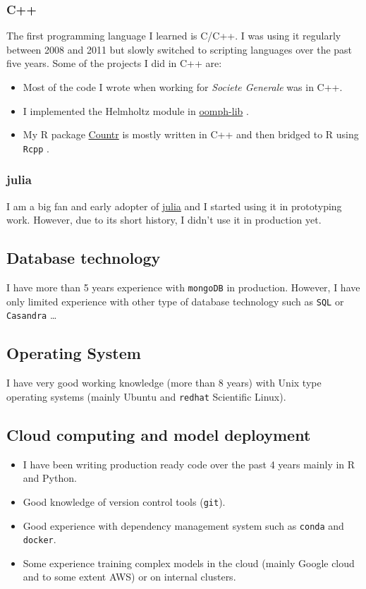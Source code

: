 \documentclass[11pt]{article}
\begin{document}
\subsubsection{C++}
\label{sec:org3cc3ba3}
The first programming language I learned is C/C++. I was using it regularly
between 2008 and 2011 but slowly switched to scripting languages over the
past five years. Some of the projects I did in C++ are:
\begin{itemize}
\item Most of the code I wrote when working for \emph{Societe Generale} was in C++.
\item I implemented the Helmholtz module in \href{http://oomph-lib.maths.man.ac.uk/doc/html/index.html}{oomph-lib} \cite{heil2006oomph}.
\item My R package \href{https://cran.r-project.org/web/packages/Countr/index.html}{Countr} \cite{kharrat2019flexible} is mostly written in C++ and
then bridged to R using \texttt{Rcpp} \cite{Eddelbuettel2017rcpp}.
\end{itemize}
\subsubsection{julia}
\label{sec:org73383cd}
I am a big fan and early adopter of \href{https://julialang.org/}{julia} and I started using it in
prototyping work. However, due to its short history, I didn't use it in
production yet.
\subsection{Database technology}
\label{sec:org45d83cd}
I have more than 5 years experience with \texttt{mongoDB} in production. However, I
have only limited experience with other type of database technology such as
\texttt{SQL} or \texttt{Casandra} \ldots{}
\subsection{Operating System}
\label{sec:org814a58d}
I have very good working knowledge (more than 8 years) with Unix type
operating systems (mainly Ubuntu and \texttt{redhat} Scientific Linux).
\subsection{Cloud computing and model deployment}
\label{sec:org8a1fcbe}
\begin{itemize}
\item I have been writing production ready code over the past 4 years mainly in R
and Python.
\item Good knowledge of version control tools (\texttt{git}).
\item Good experience with dependency management system such as \texttt{conda} and \texttt{docker}.
\item Some experience training complex models in the cloud (mainly Google cloud
and to some extent AWS) or on internal clusters.
\end{itemize}



\end{document}
